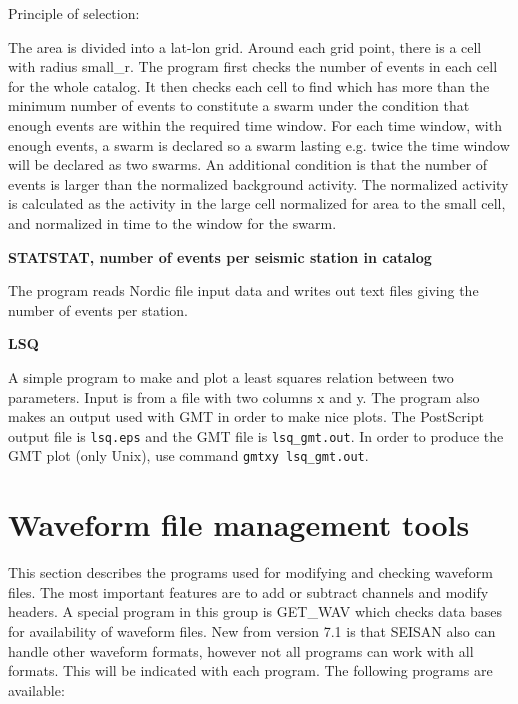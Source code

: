 Principle of selection: 

The area is divided into a lat-lon grid. Around each grid point, there is a cell with radius small\_r. The program first checks the number of events in each cell for the whole catalog. It then checks each cell to 
find which has more than the minimum number of events to constitute a swarm under the condition that enough events are within the required time window. For each time window, with enough events, a swarm is declared so a swarm lasting e.g. twice the time window will be declared as two swarms. An additional condition is that the number of events is larger than the normalized background activity. The normalized activity is calculated as the activity in the large cell normalized for area to the small cell, and normalized in time to the window for the swarm. 

\textbf{STATSTAT, number of events per seismic station in catalog}

The program reads Nordic file input data and writes out text files giving the number of events per station. 

\textbf{LSQ}

A simple program to make and plot a least squares relation between 
two parameters. Input is from a file with two columns x and y. The 
program also makes an output used with GMT in order to make nice 
plots. The PostScript output  file is \texttt{lsq.eps} and the GMT file is 
\texttt{lsq\_gmt.out}. In order to produce the GMT plot (only Unix), use 
command \texttt{gmtxy lsq\_gmt.out}. 

\section{Waveform file management tools}

This section describes the programs used for modifying and checking waveform files. The most important features are to add or subtract channels and modify headers. A special program in this group is GET\_WAV which checks data bases for availability of waveform files. New from version 7.1 is that SEISAN also can handle other waveform formats, however not all programs can work with all formats. This will be indicated with each program. The following programs are available: 

